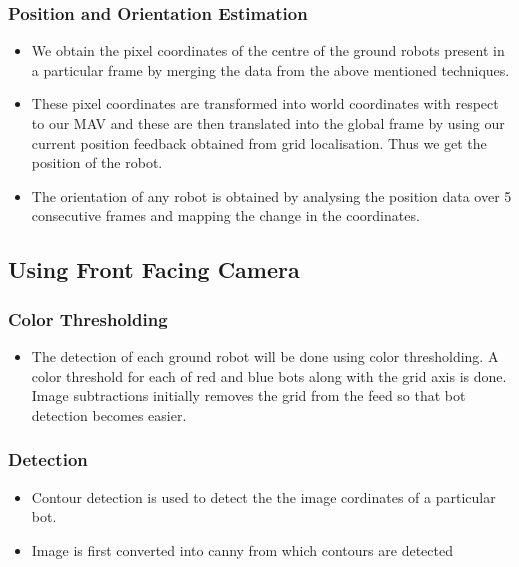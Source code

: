 \documentclass[12pt]{article}
\begin{document}
       	\subsubsection{Position and Orientation Estimation}
       		\begin{itemize}
       			\item We obtain the pixel coordinates of the centre of the ground robots present in a particular frame by merging the data from the above mentioned techniques.
       			\item These pixel coordinates are transformed into world coordinates with respect to our MAV and these are then translated into the global frame by using our current position feedback obtained from grid localisation. Thus we get the position of the robot.
       			\item  The orientation of any robot is obtained by analysing the position data over 5 consecutive frames and mapping the change in the coordinates.
       		\end{itemize}  
    \subsection{Using Front Facing Camera}
    	\subsubsection{Color Thresholding}       
			\begin{itemize}
        		\item The detection of each ground robot will be done using color             thresholding. A color threshold for each of red and blue bots along with the grid axis is done. Image subtractions initially removes the grid from the feed so that bot detection becomes easier.
        	\end{itemize}
		\subsubsection{Detection}
			\begin{itemize}           
				\item Contour detection is used to detect the the image cordinates of a particular bot. 
				\item Image is first converted into canny from which contours are detected         
			\end{itemize}            
\end{document}
